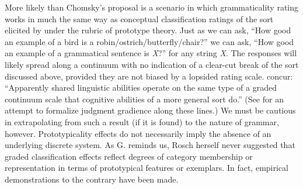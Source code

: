 More likely than Chomsky's proposal is a scenario in which grammaticality rating works in much the same way as conceptual classification ratings of the sort elicited by \citet{Rosch1975} under the rubric of prototype theory. Just as we can ask, ``How good an example of a bird is a robin/ostrich/butterfly/chair?''  we can ask, ``How good an example of a grammatical sentence is \textit{X}?'' for any string \textit{X}. The responses will likely spread along a continuum with no indication of a clear-cut break of the sort discussed above, provided they are not biased by a lopsided rating scale. \citet[47]{KessEtAl1983}
concur: ``Apparently shared linguistic abilities operate on the same type of a graded continuum scale that cognitive abilities of a more general sort do.'' (See  for an attempt to formalize judgment gradience along these lines.) We must be cautious in extrapolating from such a result (if it is found) to the nature of grammar, however. Prototypicality effects do not necessarily imply the absence of an underlying discrete system. As
G. \citet{Lakoff1987} reminds us, Rosch herself never suggested that graded classification effects reflect degrees of category membership or representation in terms of prototypical features or exemplars. In fact, empirical demonstrations to the contrary have been made.

